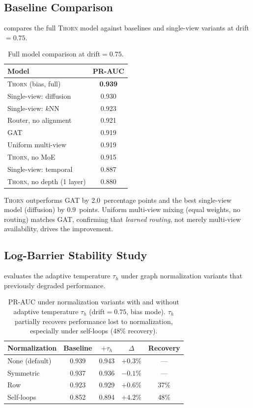 \documentclass[11pt,a4paper]{article}
\newcommand{\thorn}{\textsc{Thorn}}
\begin{document}
\subsection{Baseline Comparison}
\label{sec:baselines}

 compares the full \thorn{} model against baselines
and single-view variants at drift${}=0.75$.

\begin{table}[t]
\centering
\caption{Full model comparison at drift${}=0.75$.}
\label{tab:baselines}
\begin{tabular}{@{}lc@{}}
\toprule
Model & PR-AUC \\
\midrule
\thorn{} (bias, full) & \textbf{0.939} \\
Single-view: diffusion & 0.930 \\
Single-view: $k$NN & 0.923 \\
Router, no alignment & 0.921 \\
GAT \citep{velickovic2018graph} & 0.919 \\
Uniform multi-view & 0.919 \\
\thorn{}, no MoE & 0.915 \\
Single-view: temporal & 0.887 \\
\thorn{}, no depth (1 layer) & 0.880 \\
\bottomrule
\end{tabular}
\end{table}

\thorn{} outperforms GAT by 2.0~percentage points and the best
single-view model (diffusion) by 0.9~points.
Uniform multi-view mixing (equal weights, no routing) matches GAT,
confirming that \emph{learned routing}, not merely multi-view
availability, drives the improvement.

\subsection{Log-Barrier Stability Study}
\label{sec:stability}

 evaluates the adaptive temperature $\tau_h$
under graph normalization variants that previously degraded performance.

\begin{table}[t]
\centering
\caption{PR-AUC under normalization variants with and without adaptive
temperature $\tau_h$ (drift${}=0.75$, bias mode).
$\tau_h$ partially recovers performance lost to normalization,
especially under self-loops (48\% recovery).}
\label{tab:stability}
\begin{tabular}{@{}lcccc@{}}
\toprule
Normalization & Baseline & $+\tau_h$ & $\Delta$ & Recovery \\
\midrule
None (default) & 0.939 & 0.943 & $+0.3\%$ & --- \\
Symmetric & 0.937 & 0.936 & $-0.1\%$ & --- \\
Row & 0.923 & 0.929 & $+0.6\%$ & 37\% \\
Self-loops & 0.852 & 0.894 & $+4.2\%$ & 48\% \\
\bottomrule
\end{tabular}
\end{table}
\end{document}

